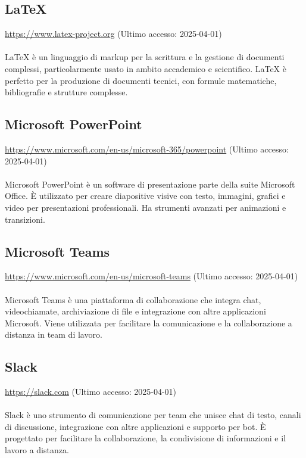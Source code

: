 \subsection{LaTeX}
\label{LaTeX}
\href{https://www.latex-project.org}{https://www.latex-project.org} (Ultimo accesso: 2025-04-01) \\ \\  
LaTeX è un linguaggio di markup per la scrittura e la gestione di documenti complessi, particolarmente usato in ambito accademico e scientifico. LaTeX è perfetto per la produzione di documenti tecnici, con formule matematiche, bibliografie e strutture complesse.

\subsection{Microsoft PowerPoint}
\label{Microsoft PowerPoint}
\href{https://www.microsoft.com/en-us/microsoft-365/powerpoint}{https://www.microsoft.com/en-us/microsoft-365/powerpoint} (Ultimo accesso: 2025-04-01) \\ \\  
Microsoft PowerPoint è un software di presentazione parte della suite Microsoft Office. È utilizzato per creare diapositive visive con testo, immagini, grafici e video per presentazioni professionali. Ha strumenti avanzati per animazioni e transizioni.

\subsection{Microsoft Teams}
\label{Microsoft Teams}
\href{https://www.microsoft.com/en-us/microsoft-teams}{https://www.microsoft.com/en-us/microsoft-teams} (Ultimo accesso: 2025-04-01) \\ \\  
Microsoft Teams è una piattaforma di collaborazione che integra chat, videochiamate, archiviazione di file e integrazione con altre applicazioni Microsoft. Viene utilizzata per facilitare la comunicazione e la collaborazione a distanza in team di lavoro.

\subsection{Slack}
\label{Slack}
\href{https://slack.com}{https://slack.com} (Ultimo accesso: 2025-04-01) \\ \\  
Slack è uno strumento di comunicazione per team che unisce chat di testo, canali di discussione, integrazione con altre applicazioni e supporto per bot. È progettato per facilitare la collaborazione, la condivisione di informazioni e il lavoro a distanza.

